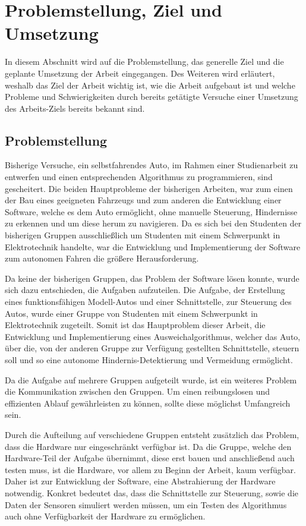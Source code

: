 \section{Problemstellung, Ziel und Umsetzung}
In diesem Abschnitt wird auf die Problemstellung, das generelle Ziel und die geplante Umsetzung der Arbeit eingegangen.
Des Weiteren wird erläutert, weshalb das Ziel der Arbeit wichtig ist, wie die Arbeit aufgebaut ist und welche Probleme und Schwierigkeiten durch bereits getätigte Versuche einer Umsetzung des Arbeits-Ziels bereits bekannt sind.

\subsection{Problemstellung}
Bisherige Versuche, ein selbstfahrendes Auto, im Rahmen einer Studienarbeit zu entwerfen und einen entsprechenden Algorithmus zu programmieren, sind gescheitert. 
Die beiden Hauptprobleme der bisherigen Arbeiten, war zum einen der Bau eines geeigneten Fahrzeugs und zum anderen die Entwicklung einer Software, welche es dem Auto ermöglicht, 
ohne manuelle Steuerung, Hindernisse zu erkennen und um diese herum zu navigieren.
Da es sich bei den Studenten der bisherigen Gruppen ausschließlich um Studenten mit einem Schwerpunkt in Elektrotechnik handelte, war die Entwicklung und Implementierung der Software zum autonomen Fahren die größere Herausforderung.

Da keine der bisherigen Gruppen, das Problem der Software lösen konnte, wurde sich dazu entschieden, die Aufgaben aufzuteilen. 
Die Aufgabe, der Erstellung eines funktionsfähigen Modell-Autos und einer Schnittstelle, zur Steuerung des Autos, wurde einer Gruppe von Studenten mit einem Schwerpunkt in Elektrotechnik zugeteilt. 
Somit ist das Hauptproblem dieser Arbeit, die Entwicklung und Implementierung eines Ausweichalgorithmus, 
welcher das Auto, über die, von der anderen Gruppe zur Verfügung gestellten Schnittstelle, steuern soll und so eine autonome Hindernis-Detektierung und Vermeidung ermöglicht.

Da die Aufgabe auf mehrere Gruppen aufgeteilt wurde, ist ein weiteres Problem die Kommunikation zwischen den Gruppen. 
Um einen reibungslosen und effizienten Ablauf gewährleisten zu können, sollte diese möglichst Umfangreich sein.

Durch die Aufteilung auf verschiedene Gruppen entsteht zusätzlich das Problem, dass die Hardware nur eingeschränkt verfügbar ist. 
Da die Gruppe, welche den Hardware-Teil der Aufgabe übernimmt, diese erst bauen und anschließend auch testen muss, ist die Hardware, vor allem zu Beginn der Arbeit, kaum verfügbar.
Daher ist zur Entwicklung der Software, eine Abstrahierung der Hardware notwendig. Konkret bedeutet das, dass die Schnittstelle zur Steuerung, sowie die Daten der Sensoren simuliert werden müssen, 
um ein Testen des Algorithmus auch ohne Verfügbarkeit der Hardware zu ermöglichen.

